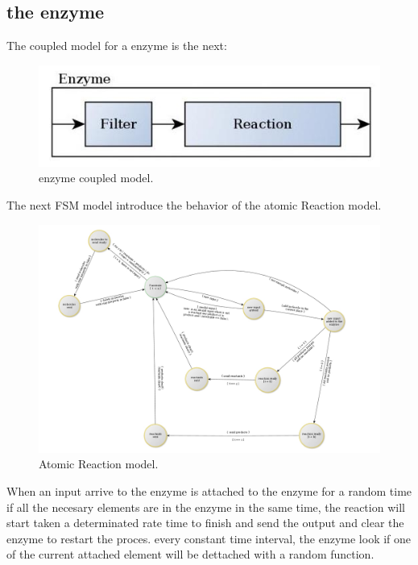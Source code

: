 \documentclass[12pt]{article}
\begin{document}
\newpage
\subsection*{the enzyme}
The coupled model for a enzyme is the next:

\begin{figure}[h!]
 \centering
  \includegraphics[width=1\textwidth]{coupled-enzyme.jpg}
 \caption{enzyme coupled model.}
\end{figure}


The next FSM model introduce the behavior of the atomic Reaction model.

\begin{figure}[h!]
 \centering
  \includegraphics[width=1\textwidth]{atomic-enzyme.jpg}
 \caption{Atomic Reaction model.}
\end{figure}

When an input arrive to the enzyme is attached to the enzyme for a random time if all the necesary elements are in the enzyme in the same time, the reaction will start taken a determinated rate time to finish and send the output and clear the enzyme to restart the proces.
every constant time interval, the enzyme look if one of the current attached element will be dettached with a random function.
\end{document}
